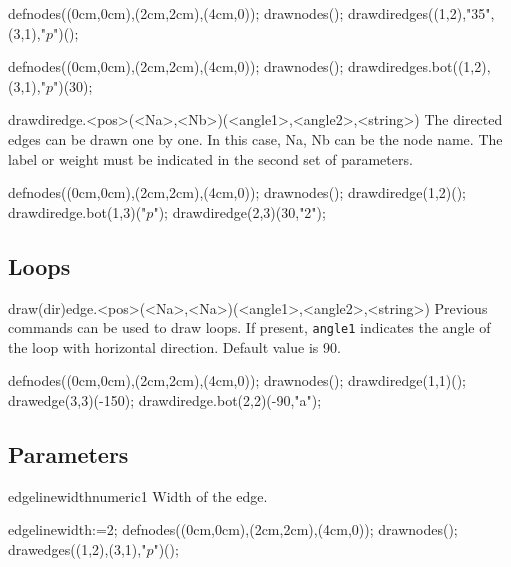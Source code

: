 \documentclass[11pt,a4paper,english]{article}
\begin{document}
\begin{exemple}[lefthand ratio = 0.6]
defnodes((0cm,0cm),(2cm,2cm),(4cm,0));
drawnodes();
drawdiredges((1,2),"35",(3,1),"$p$")();
\end{exemple}

\begin{exemple}[lefthand ratio = 0.6]
defnodes((0cm,0cm),(2cm,2cm),(4cm,0));
drawnodes();
drawdiredges.bot((1,2),(3,1),"$p$")(30);
\end{exemple}

\begin{rplabel}{drawdiredge.<pos>(<Na>,<Nb>)(<angle1>,<angle2>,<string>)}
The directed edges can be drawn one by one. In this case, Na, Nb can be the node name. The label or weight must be indicated in the second set of parameters.
\end{rplabel}

\begin{exemple}[lefthand ratio = 0.6]
defnodes((0cm,0cm),(2cm,2cm),(4cm,0));
drawnodes();
drawdiredge(1,2)();
drawdiredge.bot(1,3)("$p$");
drawdiredge(2,3)(30,"2");
\end{exemple}

\subsection{Loops}
\begin{rplabel}{draw(dir)edge.<pos>(<Na>,<Na>)(<angle1>,<angle2>,<string>)}
Previous commands can be used to draw loops. If present, \verb|angle1| indicates the angle of the loop with horizontal direction. Default value is 90.
\end{rplabel}

\begin{exemple}[lefthand ratio = 0.6]
defnodes((0cm,0cm),(2cm,2cm),(4cm,0));
drawnodes();
drawdiredge(1,1)();
drawedge(3,3)(-150);
drawdiredge.bot(2,2)(-90,"a");
\end{exemple}


\subsection{Parameters}
\begin{mptparam}{edgelinewidth}{numeric}{1}
Width of the edge.
\end{mptparam}

\begin{exemple}[lefthand ratio = 0.6]
edgelinewidth:=2;
defnodes((0cm,0cm),(2cm,2cm),(4cm,0));
drawnodes();
drawedges((1,2),(3,1),"$p$")();
\end{exemple}
\end{document}
